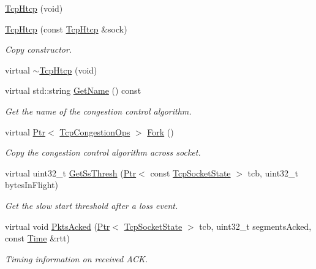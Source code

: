 \begin{DoxyCompactItemize}
\item 
\hyperlink{classns3_1_1TcpHtcp_ab7b381b89c4a15077fe861adb48b9cea}{Tcp\+Htcp} (void)
\item 
\hyperlink{classns3_1_1TcpHtcp_af53e5e2908e213b39712c11ffa6d412b}{Tcp\+Htcp} (const \hyperlink{classns3_1_1TcpHtcp}{Tcp\+Htcp} \&sock)
\begin{DoxyCompactList}\small\item\em Copy constructor. \end{DoxyCompactList}\item 
virtual \hyperlink{classns3_1_1TcpHtcp_afac94f9cd5ff2a749a5c563f12c4f6ee}{$\sim$\+Tcp\+Htcp} (void)
\item 
virtual std\+::string \hyperlink{classns3_1_1TcpHtcp_ad59318c863c81cba937ca8e677a9b07e}{Get\+Name} () const 
\begin{DoxyCompactList}\small\item\em Get the name of the congestion control algorithm. \end{DoxyCompactList}\item 
virtual \hyperlink{classns3_1_1Ptr}{Ptr}$<$ \hyperlink{classns3_1_1TcpCongestionOps}{Tcp\+Congestion\+Ops} $>$ \hyperlink{classns3_1_1TcpHtcp_ac43b14656621c83a4f229e97052c633c}{Fork} ()
\begin{DoxyCompactList}\small\item\em Copy the congestion control algorithm across socket. \end{DoxyCompactList}\item 
virtual uint32\+\_\+t \hyperlink{classns3_1_1TcpHtcp_add36278610893b4eba23cf688f7779d8}{Get\+Ss\+Thresh} (\hyperlink{classns3_1_1Ptr}{Ptr}$<$ const \hyperlink{classns3_1_1TcpSocketState}{Tcp\+Socket\+State} $>$ tcb, uint32\+\_\+t bytes\+In\+Flight)
\begin{DoxyCompactList}\small\item\em Get the slow start threshold after a loss event. \end{DoxyCompactList}\item 
virtual void \hyperlink{classns3_1_1TcpHtcp_ad09157c644632f904b019423e0bf555b}{Pkts\+Acked} (\hyperlink{classns3_1_1Ptr}{Ptr}$<$ \hyperlink{classns3_1_1TcpSocketState}{Tcp\+Socket\+State} $>$ tcb, uint32\+\_\+t segments\+Acked, const \hyperlink{classns3_1_1Time}{Time} \&rtt)
\begin{DoxyCompactList}\small\item\em Timing information on received A\+CK. \end{DoxyCompactList}\end{DoxyCompactItemize}
